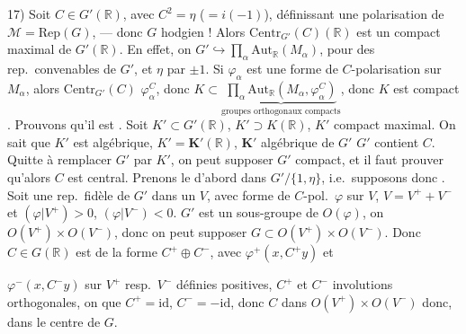 \documentclass[11pt,a4paper]{article}
\begin{document}
17) Soit $C \in G'(\mathbb{R})$, avec $C^{2} = \eta$ ($= i(-1)$),
définissant une polarisation de  $\mathcal{M} = \mathrm{Rep}(G)$, ---
donc $G$ hodgien ! Alors $\mathrm{Centr}_{G'}(C)(\mathbb{R})$ est un compact
maximal de $G'(\mathbb{R})$. En effet, on \struck{\ill{}} 
\struck{\ill{}}  $G' \hookrightarrow \prod_{\alpha}
\mathrm{Aut}_{\mathbb{R}}(M_{\alpha})$, pour des rep.\ convenables
 de $G'$, et  $\eta$
 par $\pm 1$. Si $\varphi_{\alpha}$ est une forme de
$C$-polarisation sur $M_{\alpha}$, alors 
$\mathrm{Centr}_{G'}(C)$  $\varphi^{C}_{\alpha}$,
donc  $K \subset \underbrace{\prod_{\alpha}
\mathrm{Aut}_{\mathbb{R}}(M_{\alpha}, \varphi^{C}_{\alpha})}_{\text{groupes
orthogonaux compacts}}$, donc $K$ est compact \ill{}. Prouvons
 qu'il est \struck{\ill{}} .
\struck{\ill{}} Soit  $K' \subset G'(\mathbb{R})$, $K' \supset
K(\mathbb{R})$, \add{\ill{}} $K'$ compact maximal. \struck{\ill{}} On sait
que $K'$ est algébrique, $K' = \mathbf{K}'(\mathbb{R})$, $\mathbf{K}'$
 algébrique de $G'$ \add{\ill{}} \struck{\ill{}} $G'$
contient $C$. Quitte à remplacer $G'$ par $K'$, on peut supposer $G'$
compact, et il faut prouver qu'alors $C$ est central. Prenons le d'abord
dans $G'/\{1, \eta\}$, i.e.\ supposons donc . Soit une
rep.\ fidèle de $G'$ dans un $V$, avec forme de $C$-pol.\ $\varphi$ sur $V$,
 
 $V = V^{+} + V^{-}$ et $(\varphi|V^{+}) > 0$,
$(\varphi|V^{-}) < 0$.   $G'$ est un sous-groupe de
$O(\varphi)$, on   $O(V^{+}) \times O(V^{-})$, donc on peut supposer $G \subset
O(V^{+}) \times O(V^{-})$. Donc $C \in G(\mathbb{R})$ est de la forme
$C^{+} \oplus C^{-}$, \struck{\ill{}} avec $\varphi^{+}(x, C^{+} y)$ et

$\varphi^{-}(x, C^{-} y)$ sur $V^{+}$ resp.\ $V^{-}$ \add{\ill{}} définies
positives, \struck{\ill{}} $C^{+}$ et $C^{-}$  involutions
orthogonales, \ill{} on  que $C^{+} = \mathrm{id}$,
$C^{-} = -\mathrm{id}$, donc $C$  dans 
 $O(V^{+}) \times O(V^{-})$ donc, dans le centre de $G$.
\end{document}
